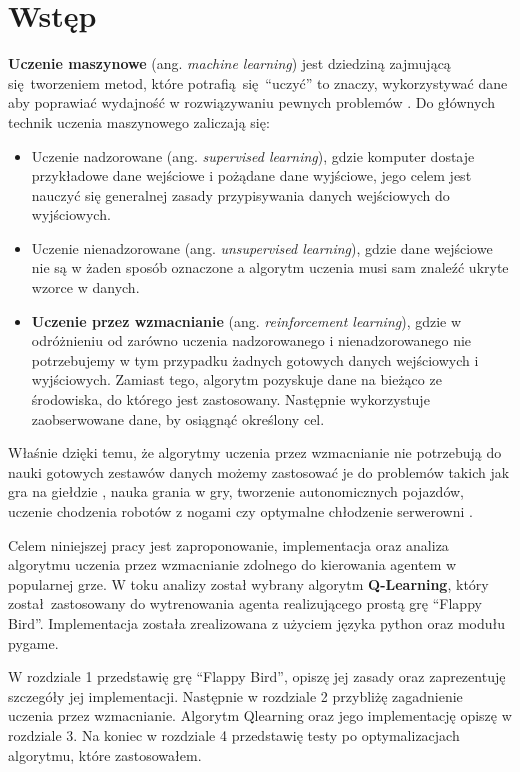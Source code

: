 \documentclass[a4paper, 12pt,twoside]{report}
\newcommand\chap[1]{%
  \chapter*{#1}%
  \addcontentsline{toc}{chapter}{#1}}
\begin{document}
\chap{Wstęp}
\textbf{Uczenie maszynowe} (ang. \textit{machine learning}) jest dziedziną
zajmującą się tworzeniem metod, które potrafią się ``uczyć'' to znaczy,
wykorzystywać dane aby poprawiać wydajność w rozwiązywaniu pewnych
problemów \cite{machine_learning_definition}.
Do głównych technik uczenia maszynowego zaliczają się:
\begin{itemize}
	\setlength\itemsep{-0.4em}
\item Uczenie nadzorowane (ang. \textit{supervised learning}), gdzie komputer
	dostaje przykładowe dane wejściowe i
	pożądane dane wyjściowe, jego celem jest nauczyć się generalnej zasady
	przypisywania danych wejściowych do wyjściowych.
\item Uczenie nienadzorowane (ang. \textit{unsupervised learning}), gdzie dane
	wejściowe nie są w żaden sposób
	oznaczone a algorytm uczenia musi sam znaleźć ukryte wzorce w danych.
\item \textbf{Uczenie przez wzmacnianie}
	(ang. \textit{reinforcement learning}), gdzie w odróżnieniu od zarówno
	uczenia 
	nadzorowanego i nienadzorowanego nie potrzebujemy w tym przypadku
	żadnych	gotowych danych wejściowych i wyjściowych. Zamiast tego,
	algorytm pozyskuje dane na bieżąco ze środowiska, do którego jest
	zastosowany. Następnie wykorzystuje zaobserwowane dane, by osiągnąć
	określony cel.
\end{itemize}

Właśnie dzięki temu, że algorytmy uczenia przez wzmacnianie nie potrzebują do
nauki gotowych
zestawów danych możemy zastosować je do problemów takich jak gra na
giełdzie \cite{trading_reinforcement}, nauka grania w gry, tworzenie
autonomicznych pojazdów, uczenie chodzenia robotów z nogami czy optymalne
chłodzenie serwerowni \cite{reinforcement_applications}.

Celem niniejszej pracy jest zaproponowanie, implementacja oraz analiza
algorytmu uczenia przez wzmacnianie zdolnego do kierowania agentem w popularnej
grze. W toku analizy został wybrany algorytm \textbf{Q-Learning}, który
został zastosowany do wytrenowania agenta realizującego prostą grę ``Flappy
Bird''. Implementacja została zrealizowana z użyciem języka python oraz modułu
pygame.

W rozdziale 1 przedstawię grę ``Flappy Bird'',
opiszę jej
zasady oraz zaprezentuję szczegóły jej implementacji. Następnie w rozdziale
2 przybliżę zagadnienie uczenia przez
wzmacnianie. Algorytm Q\dywiz learning oraz jego implementację opiszę w
rozdziale 3. Na koniec w rozdziale
4 przedstawię testy po optymalizacjach algorytmu,
które zastosowałem.
\newpage{}
\end{document}
